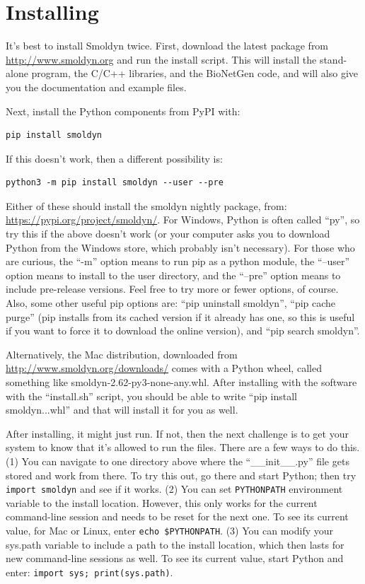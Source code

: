 \documentclass {scrbook}
\newcommand {\ttt} {\texttt}
\begin{document}
\section{Installing}

It's best to install Smoldyn twice. First, download the latest package from \url{http://www.smoldyn.org} and run the install script. This will install the stand-alone program, the C/C++ libraries, and the BioNetGen code, and will also give you the documentation and example files.

Next, install the Python components from PyPI with:
\begin{lstlisting}[style=SSAC]
pip install smoldyn
\end{lstlisting}
If this doesn't work, then a different possibility is:
\begin{lstlisting}[style=SSAC]
python3 -m pip install smoldyn --user --pre
\end{lstlisting}
Either of these should install the smoldyn nightly package, from: \url{https://pypi.org/project/smoldyn/}. For Windows, Python is often called ``py'', so try this if the above doesn't work (or your computer asks you to download Python from the Windows store, which probably isn't necessary). For those who are curious, the ``-m'' option means to run pip as a python module, the ``--user'' option means to install to the user directory, and the ``--pre'' option means to include pre-release versions. Feel free to try more or fewer options, of course. Also, some other useful pip options are: ``pip uninstall smoldyn'', ``pip cache purge'' (pip installs from its cached version if it already has one, so this is useful if you want to force it to download the online version), and ``pip search smoldyn''.

Alternatively, the Mac distribution, downloaded from \url{http://www.smoldyn.org/downloads/} comes with a Python wheel, called something like smoldyn-2.62-py3-none-any.whl. After installing with the software with the ``install.sh'' script, you should be able to write ``pip install smoldyn...whl'' and that will install it for you as well.

After installing, it might just run. If not, then the next challenge is to get your system to know that it's allowed to run the files. There are a few ways to do this. (1) You can navigate to one directory above where the ``\_\_init\_\_.py'' file gets stored and work from there. To try this out, go there and start Python; then try \ttt{import smoldyn} and see if it works. (2) You can set \ttt{PYTHONPATH} environment variable to the install location. However, this only works for the current command-line session and needs to be reset for the next one. To see its current value, for Mac or Linux, enter \ttt{echo \$PYTHONPATH}. (3) You can modify your sys.path variable to include a path to the install location, which then lasts for new command-line sessions as well. To see its current value, start Python and enter: \ttt{import sys; print(sys.path)}.
\end{document}
